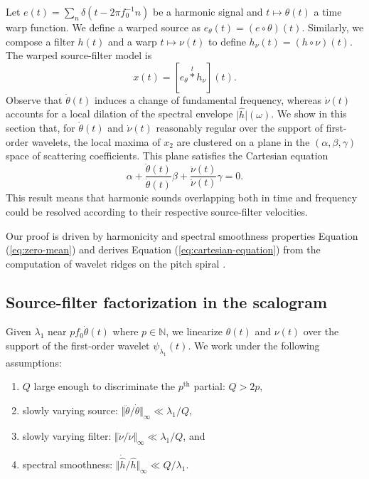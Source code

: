 \documentclass[twoside,a4paper]{article}
\begin{document}
Let $e(t)=\sum_{n}\delta(t-2\pi f_{0}^{-1}n)$ be a harmonic signal and
$t\mapsto\theta(t)$ a time warp function. We define a warped source
as $e_{\theta}(t)=(e\circ\theta)(t)$. Similarly, we compose a
filter $h(t)$ and a warp $t\mapsto\nu(t)$ to define $h_{\nu}(t)=(h\circ\nu)(t)$.
The warped source-filter model is
\begin{equation}
x(t)=[e_{\theta} \overset{t}{\ast} h_{\nu}](t).
\label{eq:source-filter}
\end{equation}
Observe that $\dot{\theta}(t)$ induces a change of fundamental frequency, where\-as
$\dot{\nu}(t)$ accounts for a local dilation of the spectral
envelope $\vert\widehat{h}\vert(\omega)$.
We show in this section that, for $\dot{\theta}(t)$ and $\dot{\nu}(t)$ reasonably regular over the support of first-order wavelets,
the local maxima of $x_{2}$ are clustered on a plane in the $(\alpha,\beta,\gamma)$ space of scattering coefficients.
This plane satisfies the Cartesian equation
\begin{equation}
\alpha +
\dfrac{\ddot{\theta}(t)}{\dot{\theta}(t)}\beta +
\dfrac{\ddot{\nu}(t)}{\dot{\nu}(t)}\gamma = 0.
\label{eq:cartesian-equation}
\end{equation}
This result means that harmonic sounds overlapping both in time and frequency could be resolved according to their respective source-filter velocities.

Our proof is driven by harmonicity and spectral smoothness properties \textemdash{} Equation (\ref{eq:zero-mean}) \textemdash{} and derives Equation (\ref{eq:cartesian-equation}) from the computation of wavelet ridges on the pitch spiral \cite{Delprat1992}.



\subsection{Source-filter factorization in the scalogram}
Given $\lambda_1$ near $p f_0 \dot{\theta}(t)$ where $p \in \mathbb{N}$, we linearize $\theta(t)$ and $\nu(t)$ over the support of the first-order wavelet $\psi_{\lambda_1}(t)$. We work under the following assumptions:

\renewcommand{\labelenumi}{(\alph{enumi})}
\begin{enumerate}
\item $Q$ large enough to discriminate the $p^\text{th}$ partial: $Q>2p$,
\item slowly varying source: $\Vert\ddot{\theta}/\dot{\theta}\Vert_{\infty} \ll \lambda_{1}/Q$,
\item slowly varying filter: $\Vert\ddot{\nu}/\dot{\nu}\Vert_{\infty}\ll\lambda_{1}/Q$, and
\item spectral smoothness: $\Vert\dot{\hat{h}}/\hat{h}\Vert_{\infty} \ll Q / \lambda_{1}$.
\end{enumerate}
\end{document}
